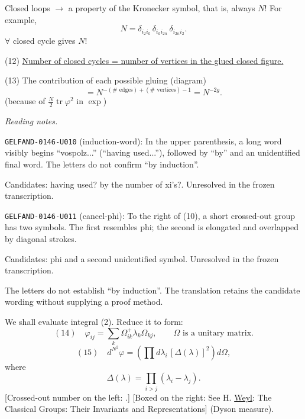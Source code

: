 Closed loops $\longrightarrow$ a property of the Kronecker symbol,
that is, always $N$! For example,
\begin{equation*}
N=\delta_{i_2i_k}\,\delta_{i_ki_{2n}}\,\delta_{i_{2n}i_2}.
\end{equation*}
$\forall$ closed cycle gives $N$!

(12) \underline{Number of closed cycles = number of vertices in the glued closed figure.}

(13) The contribution of each possible gluing (diagram)
\begin{equation*}
=N^{-(\#\text{ edges})+(\#\text{ vertices})-1}=N^{-2g}.
\end{equation*}
(because of $\frac N2\operatorname{tr}\varphi^2$ in $\exp$)



\par\smallskip\noindent\textit{Reading notes.}\par
\noindent\texttt{GELFAND-0146-U010} (induction-word): In the upper parenthesis, a long word visibly begins “vospolz...” (“having used...”), followed by “by” and an unidentified final word. The letters do not confirm “by induction”.\par
Candidates: having used? by the number of xi’s?. Unresolved in the frozen transcription.\par
\noindent\texttt{GELFAND-0146-U011} (cancel-phi): To the right of (10), a short crossed-out group has two symbols. The first resembles phi; the second is elongated and overlapped by diagonal strokes.\par
Candidates: phi and a second unidentified symbol. Unresolved in the frozen transcription.\par
The letters do not establish “by induction”. The translation retains the candidate wording without supplying a proof method.\par


We shall evaluate integral (2). Reduce it to  form:
\begin{equation*}
(14)\quad \varphi_{ij}=\sum_k\Omega^+_{ik}\lambda_k\Omega_{kj},\qquad \Omega\text{ is a unitary matrix}.
\end{equation*}
\begin{equation*}
(15)\quad d^{N^2}\varphi=\left(\prod d\lambda_i\,[\Delta(\lambda)]^2\right)d\Omega,
\end{equation*}
where
\begin{equation*}
\Delta(\lambda)=\prod_{i>j}(\lambda_i-\lambda_j).
\end{equation*}
[Crossed-out number on the left: .]
[Boxed on the right: See H. \underline{Weyl}: The Classical Groups: Their Invariants and Representations]
(Dyson measure).

